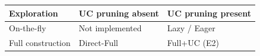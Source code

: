 \begin{tabular}{lll}
\toprule
Exploration & UC pruning absent & UC pruning present \\
\midrule
On-the-fly & Not implemented & Lazy / Eager \\
Full construction & Direct-Full & Full+UC (E2) \\
\bottomrule
\end{tabular}
